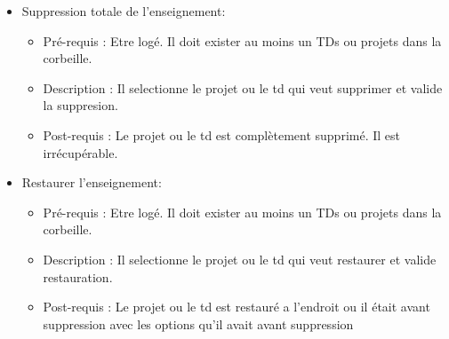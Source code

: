 \begin{itemize}
		\begin{itemize}
		\item Suppression totale de l'enseignement:
			\begin{itemize}
			\item Pr{\'e}-requis : Etre log{\'e}. Il doit exister au moins un TDs ou projets dans la corbeille.\\
			\item Description : Il selectionne le projet ou le td qui veut supprimer et valide la suppresion.\\
			\item Post-requis : Le projet ou le td est compl{\`e}tement supprim{\'e}. Il est irr{\'e}cup{\'e}rable.
			\end{itemize}
		\end{itemize}
		\begin{itemize}	
		\item Restaurer l'enseignement:
			\begin{itemize}
			\item Pr{\'e}-requis : Etre log{\'e}. Il doit exister au moins un TDs ou projets dans la corbeille.\\
			\item Description : Il selectionne le projet ou le td qui veut restaurer et valide restauration.\\
			\item Post-requis : Le projet ou le td est restaur{\'e} a l'endroit ou il {\'e}tait avant suppression avec les options qu'il avait avant suppression
			\end{itemize}
		\end{itemize}


	\end{itemize}



